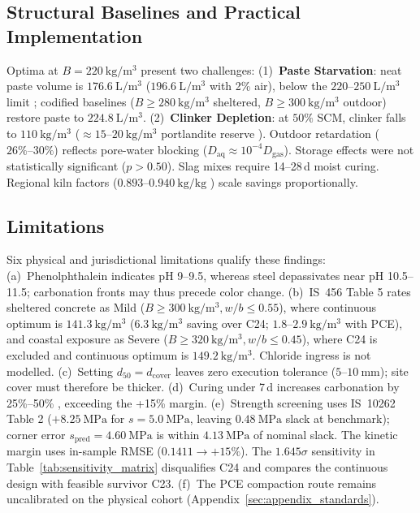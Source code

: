 \documentclass[journal]{IEEEtran}
\begin{document}
\subsection{Structural Baselines and Practical Implementation}
Optima at $B = 220\ \mathrm{kg/m^3}$ present two challenges:
(1)~\textbf{Paste Starvation}: neat paste volume is $176.6\ \mathrm{L/m^3}$ ($196.6\ \mathrm{L/m^3}$ with 2\% air), below the $220\text{--}250\ \mathrm{L/m^3}$ limit \cite{neville2011}; codified baselines ($B \ge 280\ \mathrm{kg/m^3}$ sheltered, $B \ge 300\ \mathrm{kg/m^3}$ outdoor) restore paste to $224.8\ \mathrm{L/m^3}$.
(2)~\textbf{Clinker Depletion}: at $50\%$ SCM, clinker falls to $110\ \mathrm{kg/m^3}$ ($\approx 15\text{--}20\ \mathrm{kg/m^3}$ portlandite reserve \cite{taylor1997, papadakis1992}). Outdoor retardation ($26\%\text{--}30\%$) reflects pore-water blocking ($D_{\mathrm{aq}} \approx 10^{-4} D_{\mathrm{gas}}$). Storage effects were not statistically significant ($p > 0.50$). Slag mixes require 14--28\,d moist curing. Regional kiln factors ($0.893\text{--}0.940\ \mathrm{kg/kg}$ \cite{karadumpa2024}) scale savings proportionally.

\subsection{Limitations}
Six physical and jurisdictional limitations qualify these findings:
(a)~Phenolphthalein indicates pH 9--9.5, whereas steel depassivates near pH 10.5--11.5; carbonation fronts may thus precede color change.
(b)~IS~456 Table 5 rates sheltered concrete as Mild ($B \ge 300\ \mathrm{kg/m^3}, w/b \le 0.55$), where continuous optimum is $141.3\ \mathrm{kg/m^3}$ ($6.3\ \mathrm{kg/m^3}$ saving over C24; $1.8\text{--}2.9\ \mathrm{kg/m^3}$ with PCE), and coastal exposure as Severe ($B \ge 320\ \mathrm{kg/m^3}, w/b \le 0.45$), where C24 is excluded and continuous optimum is $149.2\ \mathrm{kg/m^3}$. Chloride ingress is not modelled.
(c)~Setting $d_{50} = d_{\mathrm{cover}}$ leaves zero execution tolerance ($5\text{--}10\ \mathrm{mm}$); site cover must therefore be thicker.
(d)~Curing under 7\,d increases carbonation by 25\%--50\% \cite{parrott1996}, exceeding the +15\% margin.
(e)~Strength screening uses IS~10262 Table 2 ($+8.25\ \mathrm{MPa}$ for $s=5.0\ \mathrm{MPa}$, leaving $0.48\ \mathrm{MPa}$ slack at benchmark); corner error $s_{\mathrm{pred}} = 4.60\ \mathrm{MPa}$ is within $4.13\ \mathrm{MPa}$ of nominal slack. The kinetic margin uses in-sample RMSE ($0.1411 \to +15\%$). The $1.645\sigma$ sensitivity in Table~\ref{tab:sensitivity_matrix} disqualifies C24 and compares the continuous design with feasible survivor C23.
(f)~The PCE compaction route remains uncalibrated on the physical cohort (Appendix~\ref{sec:appendix_standards}).
\end{document}
